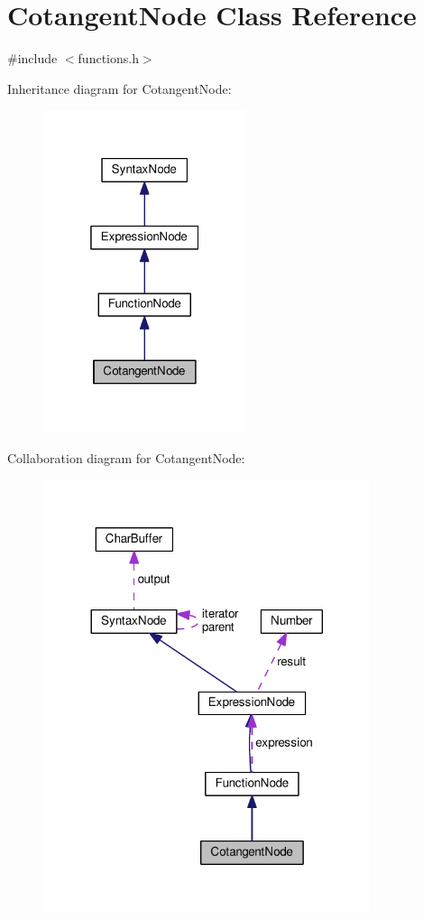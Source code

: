 \hypertarget{classCotangentNode}{}\section{Cotangent\+Node Class Reference}
\label{classCotangentNode}


{\ttfamily \#include $<$functions.\+h$>$}



Inheritance diagram for Cotangent\+Node\+:\nopagebreak
\begin{figure}[H]
\begin{center}
\leavevmode
\includegraphics[width=169pt]{classCotangentNode__inherit__graph}
\end{center}
\end{figure}


Collaboration diagram for Cotangent\+Node\+:\nopagebreak
\begin{figure}[H]
\begin{center}
\leavevmode
\includegraphics[width=272pt]{classCotangentNode__coll__graph}
\end{center}
\end{figure}
